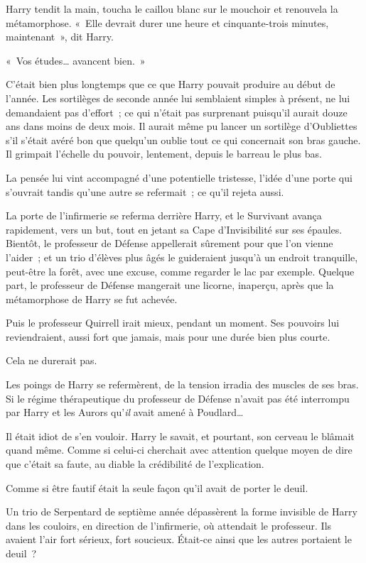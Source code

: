 {Harry tendit la main, toucha le caillou blanc sur le mouchoir et renouvela la métamorphose.
«~Elle devrait durer une heure et cinquante-trois minutes, maintenant~», dit Harry.

«~Vos études… avancent bien.~»

C'était bien plus longtemps que ce que Harry pouvait produire au début de l'année.
Les sortilèges de seconde année lui semblaient simples à présent, ne lui demandaient pas d'effort~; ce qui n'était pas surprenant puisqu'il aurait douze ans dans moins de deux mois.
Il aurait même pu lancer un sortilège d'Oubliettes s'il s'était avéré bon que quelqu'un oublie tout ce qui concernait son bras gauche.
Il grimpait l'échelle du pouvoir, lentement, depuis le barreau le plus bas.

La pensée lui vint accompagné d'une potentielle tristesse, l'idée d'une porte qui s'ouvrait tandis qu'une autre se refermait~; ce qu'il rejeta aussi.

\later

La porte de l'infirmerie se referma derrière Harry, et le Survivant avança rapidement, vers un but, tout en jetant sa Cape d'Invisibilité sur ses épaules.
Bientôt, le professeur de Défense appellerait sûrement pour que l'on vienne l'aider~; et un trio d'élèves plus âgés le guideraient jusqu'à un endroit tranquille, peut-être la forêt, avec une excuse, comme regarder le lac par exemple.
Quelque part, le professeur de Défense mangerait une licorne, inaperçu, après que la métamorphose de Harry se fut achevée.

Puis le professeur Quirrell irait mieux, pendant un moment.
Ses pouvoirs lui reviendraient, aussi fort que jamais, mais pour une durée bien plus courte.

Cela ne durerait pas.

Les poings de Harry se refermèrent, de la tension irradia des muscles de ses bras.
Si le régime thérapeutique du professeur de Défense n'avait pas été interrompu par Harry et les Aurors qu'\emph{il} avait amené à Poudlard…

Il était idiot de s'en vouloir.
Harry le savait, et pourtant, son cerveau le blâmait quand même.
Comme si celui-ci cherchait avec attention quelque moyen de dire que c'était sa faute, au diable la crédibilité de l'explication.

Comme si être fautif était la seule façon qu'il avait de porter le deuil.

Un trio de Serpentard de septième année dépassèrent la forme invisible de Harry dans les couloirs, en direction de l'infirmerie, où attendait le professeur.
Ils avaient l'air fort sérieux, fort soucieux.
Était-ce ainsi que les autres portaient le deuil~?

}
